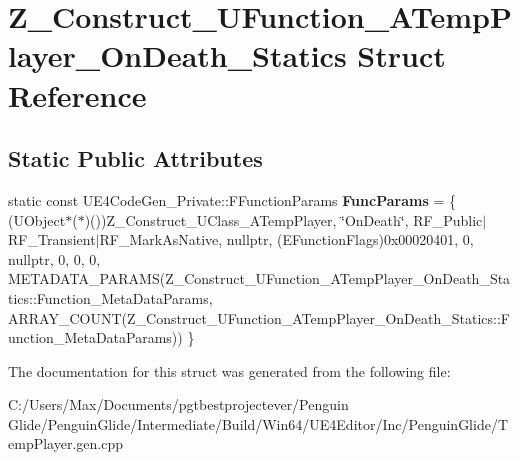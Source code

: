\hypertarget{struct_z___construct___u_function___a_temp_player___on_death___statics}{}\section{Z\+\_\+\+Construct\+\_\+\+U\+Function\+\_\+\+A\+Temp\+Player\+\_\+\+On\+Death\+\_\+\+Statics Struct Reference}
\label{struct_z___construct___u_function___a_temp_player___on_death___statics}
\subsection*{Static Public Attributes}
\begin{DoxyCompactItemize}
\item 
\mbox{\label{struct_z___construct___u_function___a_temp_player___on_death___statics_a6ee2393f52ac785f4307a488753679c4}} 
static const U\+E4\+Code\+Gen\+\_\+\+Private\+::\+F\+Function\+Params {\bfseries Func\+Params} = \{ (U\+Object$\ast$($\ast$)())Z\+\_\+\+Construct\+\_\+\+U\+Class\+\_\+\+A\+Temp\+Player, \char`\"{}On\+Death\char`\"{}, R\+F\+\_\+\+Public$\vert$R\+F\+\_\+\+Transient$\vert$R\+F\+\_\+\+Mark\+As\+Native, nullptr, (E\+Function\+Flags)0x00020401, 0, nullptr, 0, 0, 0, M\+E\+T\+A\+D\+A\+T\+A\+\_\+\+P\+A\+R\+A\+M\+S(\+Z\+\_\+\+Construct\+\_\+\+U\+Function\+\_\+\+A\+Temp\+Player\+\_\+\+On\+Death\+\_\+\+Statics\+::\+Function\+\_\+\+Meta\+Data\+Params, A\+R\+R\+A\+Y\+\_\+\+C\+O\+U\+N\+T(\+Z\+\_\+\+Construct\+\_\+\+U\+Function\+\_\+\+A\+Temp\+Player\+\_\+\+On\+Death\+\_\+\+Statics\+::\+Function\+\_\+\+Meta\+Data\+Params)) \}
\end{DoxyCompactItemize}


The documentation for this struct was generated from the following file\+:\begin{DoxyCompactItemize}
\item 
C\+:/\+Users/\+Max/\+Documents/pgtbestprojectever/\+Penguin Glide/\+Penguin\+Glide/\+Intermediate/\+Build/\+Win64/\+U\+E4\+Editor/\+Inc/\+Penguin\+Glide/Temp\+Player.\+gen.\+cpp\end{DoxyCompactItemize}
